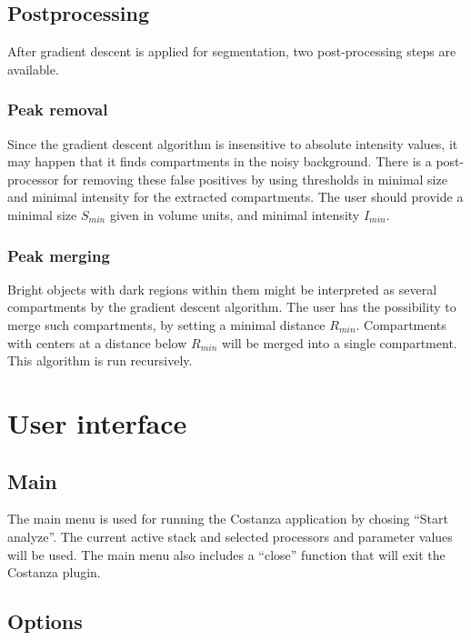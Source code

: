 \documentclass[a4paper,12pt]{article}
\begin{document}
\subsection{Postprocessing}

After gradient descent is applied for segmentation, two post-processing steps
are available.

\subsubsection{Peak removal}

Since the gradient descent algorithm is insensitive to absolute intensity
values, it may happen that it finds compartments in the noisy
background. There is a post-processor for removing these false positives by
using thresholds in minimal size and minimal intensity for the extracted
compartments. The user should provide a minimal size $S_{min}$ given in volume
units, and minimal intensity $I_{min}$.

\subsubsection{Peak merging}

Bright objects with dark regions within them might be interpreted as several
compartments by the gradient descent algorithm. The user has the possibility
to merge such compartments, by setting a minimal distance
$R_{min}$. Compartments with centers at a distance below $R_{min}$ will be
merged into a single compartment. This algorithm is run recursively.


\section{User interface}

\subsection{Main}

The main menu is used for running the Costanza application by chosing ``Start
analyze''. The current active stack and selected processors and parameter
values will be used. The main menu also includes a ``close'' function that
will exit the Costanza plugin.

\subsection{Options}
\end{document}
